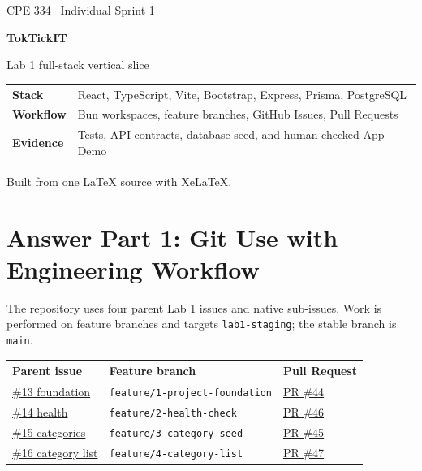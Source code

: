 \documentclass[10pt,a4paper]{article}
\begin{document}
\begin{titlepage}
  \thispagestyle{empty}
  \vspace*{18mm}
  {\Large\textcolor{accent}{CPE 334 \textbar\ Individual Sprint 1}}\par
  \vspace{10mm}
  {\Huge\bfseries TokTickIT}\par
  \vspace{3mm}
  {\Large Lab 1 full-stack vertical slice}\par
  \vfill
  \begin{tabular}{@{}>{\bfseries}p{35mm}p{95mm}@{}}
    Stack & React, TypeScript, Vite, Bootstrap, Express, Prisma, PostgreSQL \\
    Workflow & Bun workspaces, feature branches, GitHub Issues, Pull Requests \\
    Evidence & Tests, API contracts, database seed, and human-checked App Demo \\
  \end{tabular}
  \vfill
  {\small Built from one LaTeX source with XeLaTeX.}
\end{titlepage}

\tableofcontents
\clearpage

\section{Answer Part 1: Git Use with Engineering Workflow}

The repository uses four parent Lab 1 issues and native sub-issues. Work is performed on feature branches and targets \texttt{lab1-staging}; the stable branch is \texttt{main}.

\begin{tabular}{@{}p{31mm}p{52mm}p{42mm}@{}}
  \toprule
  Parent issue & Feature branch & Pull Request \\
  \midrule
  \href{https://github.com/ovenmakemeheat/toktickit/issues/13}{\#13 foundation} & \texttt{feature/1-project-foundation} & \href{https://github.com/ovenmakemeheat/toktickit/pull/44}{PR \#44} \\
  \href{https://github.com/ovenmakemeheat/toktickit/issues/14}{\#14 health} & \texttt{feature/2-health-check} & \href{https://github.com/ovenmakemeheat/toktickit/pull/46}{PR \#46} \\
  \href{https://github.com/ovenmakemeheat/toktickit/issues/15}{\#15 categories} & \texttt{feature/3-category-seed} & \href{https://github.com/ovenmakemeheat/toktickit/pull/45}{PR \#45} \\
  \href{https://github.com/ovenmakemeheat/toktickit/issues/16}{\#16 category list} & \texttt{feature/4-category-list} & \href{https://github.com/ovenmakemeheat/toktickit/pull/47}{PR \#47} \\
  \bottomrule
\end{tabular}
\end{document}
